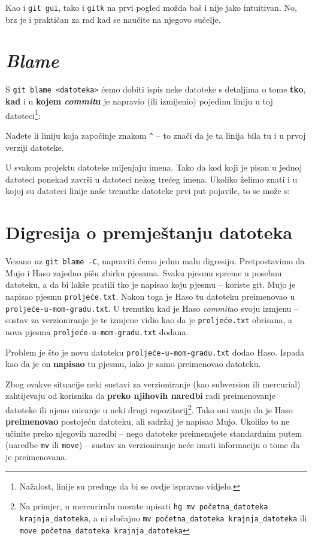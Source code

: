 Kao i \verb+git gui+, tako i \verb+gitk+ na prvi pogled možda baš i nije jako intuitivan.
No, brz je i praktičan za rad kad se naučite na njegovo sučelje.

\section*{\emph{Blame}}

S \verb+git blame <datoteka>+ ćemo dobiti ispis neke datoteke s detaljima o tome \textbf{tko}, \textbf{kad} i u \textbf{kojem \emph{commit}u} je napravio (ili izmijenio) pojedinu liniju u toj datoteci\footnote{Nažalost, linije su preduge da bi se ovdje ispravno vidjelo.}:



Nađete li liniju koja započinje znakom \verb+^+ -- to znači da je ta linija bila tu i u prvoj verziji datoteke.

U svakom projektu datoteke mijenjaju imena. 
Tako da kod koji je pisan u jednoj datoteci ponekad završi u datoteci nekog trećeg imena.
Ukoliko želimo znati i u kojoj su datoteci linije naše trenutke datoteke prvi put pojavile, to se može s:


\section*{Digresija o premještanju datoteka}

Vezano uz \verb+git blame -C+, napraviti ćemo jednu malu digresiju.
Pretpostavimo da Mujo i Haso zajedno pišu zbirku pjesama.
Svaku pjesmu spreme u posebnu datoteku, a da bi lakše pratili tko je napisao koju pjesmu -- koriste git.
Mujo je napisao pjesmu \verb+proljeće.txt+.
Nakon toga je Haso tu datoteku preimenovao u \verb+proljeće-u-mom-gradu.txt+.
U trenutku kad je Haso \emph{commit}ao svoju izmjenu -- sustav za verzioniranje je te izmjene vidio kao da je \verb+proljeće.txt+ obrisana, a nova pjesma  \verb+proljeće-u-mom-gradu.txt+ dodana.

Problem je što je novu datoteku \verb+proljeće-u-mom-gradu.txt+ dodao Haso.
Ispada kao da je on \textbf{napisao} tu pjesmu, iako je samo preimenovao datoteku.

Zbog ovakve situacije neki sustavi za verzioniranje (kao subversion ili mercurial) zahtijevaju od korisnika da \textbf{preko njihovih naredbi} radi preimenovanje datoteke ili njeno micanje u neki drugi repozitorij\footnote{Na primjer, u mercuriralu morate upisati \texttt{hg mv početna\_datoteka krajnja\_datoteka}, a ni slučajno \texttt{mv početna\_datoteka krajnja\_datoteka} ili \texttt{move početna\_datoteka krajnja\_datoteka}}.
Tako oni znaju da je Haso \textbf{preimenovao} postojeću datoteku, ali sadržaj je napisao Mujo.
Ukoliko to ne učinite preko njegovih naredbi -- nego datoteke preimenujete standardnim putem (naredbe \verb+mv+ ili \verb+move+) -- sustav za verzioniranje neće imati informaciju o tome da je preimenovana. 

